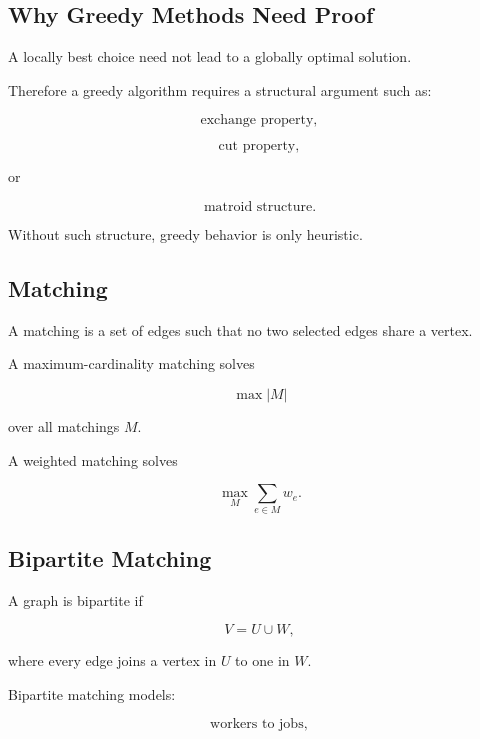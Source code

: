 \subsection{Why Greedy Methods Need Proof}
\label{subsec:why-greedy-needs-proof}

A locally best choice need not lead to a globally optimal solution.

Therefore a greedy algorithm requires a structural argument such as:

\[
\boxed{
\text{exchange property},
}
\]

\[
\boxed{
\text{cut property},
}
\]

or

\[
\boxed{
\text{matroid structure}.
}
\]

Without such structure, greedy behavior is only heuristic.

\subsection{Matching}
\label{subsec:matching-combinatorial}

A matching is a set of edges such that no two selected edges share a
vertex.

A maximum-cardinality matching solves

\[
\boxed{
\max
|M|
}
\]

over all matchings \(M\).

A weighted matching solves

\[
\boxed{
\max_{M}
\sum_{e\in M}
w_e.
}
\]

\subsection{Bipartite Matching}
\label{subsec:bipartite-matching}

A graph is bipartite if

\[
V
=
U\cup W,
\]

where every edge joins a vertex in \(U\) to one in \(W\).

Bipartite matching models:

\[
\boxed{
\text{workers to jobs},
}
\]

